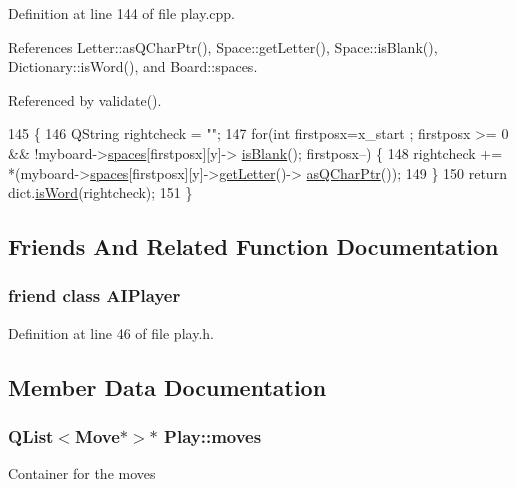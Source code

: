 Definition at line 144 of file play.\-cpp.



References Letter\-::as\-Q\-Char\-Ptr(), Space\-::get\-Letter(), Space\-::is\-Blank(), Dictionary\-::is\-Word(), and Board\-::spaces.



Referenced by validate().


\begin{DoxyCode}
145 \{
146     QString rightcheck = \textcolor{stringliteral}{""};
147     \textcolor{keywordflow}{for}(\textcolor{keywordtype}{int} firstposx=x\_start ; firstposx >= 0 && !myboard->\hyperlink{class_board_a73b12248ddb6ee3adc24f4458d8661c2}{spaces}[firstposx][y]->
      \hyperlink{class_space_a308f0ef400183df78df69717ca50cfee}{isBlank}(); firstposx--) \{
148         rightcheck += *(myboard->\hyperlink{class_board_a73b12248ddb6ee3adc24f4458d8661c2}{spaces}[firstposx][y]->\hyperlink{class_space_a207bc025538775ce43bdcc0d8c4c3599}{getLetter}()->
      \hyperlink{class_letter_aa7fb6547b5ceefef8d0a014ab0a80d08}{asQCharPtr}());
149     \}
150     \textcolor{keywordflow}{return} dict.\hyperlink{class_dictionary_afe2588ce04f6ad733c51df58a8d0d96b}{isWord}(rightcheck);
151 \}
\end{DoxyCode}


\subsection{Friends And Related Function Documentation}
\hypertarget{class_play_a2c11a076a909acd936d897cd2a81f931}{
\subsubsection[{A\-I\-Player}]{\setlength{\rightskip}{0pt plus 5cm}friend class {\bf A\-I\-Player}\hspace{0.3cm}{\ttfamily [friend]}}}\label{class_play_a2c11a076a909acd936d897cd2a81f931}


Definition at line 46 of file play.\-h.



\subsection{Member Data Documentation}
\hypertarget{class_play_ade35ae53bff24e1755a935899ee018ed}{
\subsubsection[{moves}]{\setlength{\rightskip}{0pt plus 5cm}Q\-List$<${\bf Move}$\ast$$>$$\ast$ Play\-::moves\hspace{0.3cm}{\ttfamily [private]}}}\label{class_play_ade35ae53bff24e1755a935899ee018ed}
Container for the moves 


